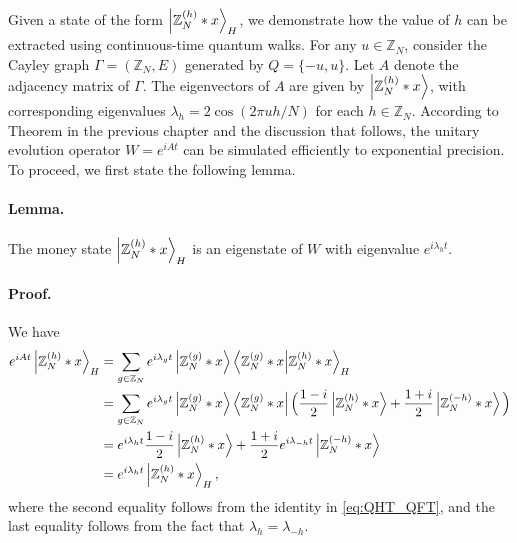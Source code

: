 \documentclass[12pt]{report}
\begin{document}
    Given a state of the form $\ket{\mathbb{Z}_N^{(h)} * x}_H$, we demonstrate how the value of $h$ can be extracted using continuous-time quantum walks. For any $u \in \mathbb{Z}_N$, consider the Cayley graph $\Gamma = (\mathbb{Z}_N, E)$ generated by $Q = {\{-u, u}\}$. Let $A$ denote the adjacency matrix of $\Gamma$. The eigenvectors of $A$ are given by $\ket{\mathbb{Z}_N^{(h)} * x}$, with corresponding eigenvalues $\lambda_h = 2\cos(2\pi uh / N)$ for each $h \in \mathbb{Z}_N$. According to Theorem in the previous chapter and the discussion that follows, the unitary evolution operator $W = e^{iAt}$ can be simulated efficiently to exponential precision. To proceed, we first state the following lemma.




    \paragraph{Lemma.}
        \label{lem:h-eigen}
        The money state $\ket{\mathbb{Z}_N^{(h)} * x}_H$ is an eigenstate of $W$ with eigenvalue $e^{i\lambda_h t}$.
    \paragraph{Proof.}
        We have 
        \begin{align*}
            e^{iAt} \ket{\mathbb{Z}_N^{(h)} * x}_H
            & = \sum_{g \in \mathbb{Z}_N} e^{i\lambda_gt} \ket{\mathbb{Z}_N^{(g)} * x} \braket{\mathbb{Z}_N^{(g)} * x}{\mathbb{Z}_N^{(h)} * x}_H \\
            & = \sum_{g \in \mathbb{Z}_N} e^{i\lambda_gt} \ket{\mathbb{Z}_N^{(g)} * x} \bra{\mathbb{Z}_N^{(g)} * x} \Big( \frac{1 - i}{2} \ket{\mathbb{Z}_N^{(h)} * x} + \frac{1 + i}{2} \ket{\mathbb{Z}_N^{(-h)} * x} \Big) \\
            & = e^{i\lambda_{h}t} \frac{1 - i}{2} \ket{\mathbb{Z}_N^{(h)} * x} + \frac{1 + i}{2} e^{i\lambda_{-h}t} \ket{\mathbb{Z}_N^{(-h)} * x} \\
            & = e^{i\lambda_{h}t} \ket{\mathbb{Z}_N^{(h)} * x}_H,
        \end{align*}
        where the second equality follows from the identity in \eqref{eq:QHT_QFT}, and the last equality follows from the fact that $\lambda_h = \lambda_{-h}$.
\end{document}

